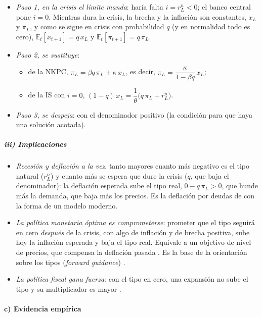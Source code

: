 \documentclass[11pt]{article}
\begin{document}
\begin{itemize}
\item \emph{Paso 1, en la crisis el límite manda}: haría falta $i=r^n_L<0$; el banco central pone $i=0$. Mientras dura la crisis, la brecha y la inflación son constantes, $x_L$ y $\pi_L$, y como se sigue en crisis con probabilidad $q$ (y en normalidad todo es cero), $\mathbb{E}_t[x_{t+1}]=q\,x_L$ y $\mathbb{E}_t[\pi_{t+1}]=q\,\pi_L$.
\item \emph{Paso 2, se sustituye}:
  \begin{itemize}
  \item de la NKPC, $\pi_L=\beta q\,\pi_L+\kappa\,x_L$, es decir, $\pi_L=\dfrac{\kappa}{1-\beta q}\,x_L$;
  \item de la IS con $i=0$, $(1-q)\,x_L=\dfrac{1}{\theta}\big(q\,\pi_L+r^n_L\big)$.
  \end{itemize}
\item \emph{Paso 3, se despeja}:
  con el denominador positivo (la condición para que haya una solución acotada).
\end{itemize}

\subparagraph{iii) Implicaciones}

\begin{itemize}
\item \emph{Recesión y deflación a la vez}, tanto mayores cuanto más negativo es el tipo natural ($r^n_L$) y cuanto más se espera que dure la crisis ($q$, que baja el denominador): la deflación esperada sube el tipo real, $0-q\,\pi_L>0$, que hunde más la demanda, que baja más los precios. Es la deflación por deudas de  con la forma de un modelo moderno.
\item \emph{La política monetaria óptima es comprometerse}: prometer que el tipo seguirá en cero \emph{después} de la crisis, con algo de inflación y de brecha positiva, sube hoy la inflación esperada y baja el tipo real. Equivale a un objetivo de nivel de precios, que compensa la deflación pasada . Es la base de la orientación sobre los tipos (\emph{forward guidance}) .
\item \emph{La política fiscal gana fuerza}: con el tipo en cero, una expansión no sube el tipo y su multiplicador es mayor .
\end{itemize}

\paragraph{c) Evidencia empírica}
\end{document}
